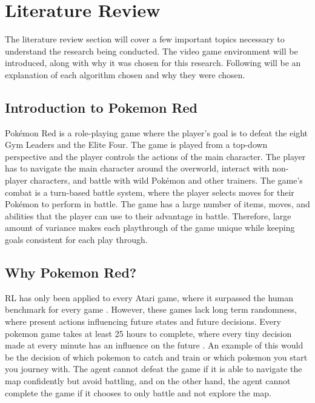 \section{Literature Review}

The literature review section will cover a few important topics necessary to understand the research being conducted. The video game environment will be introduced, along with why it was chosen for this research. Following will be an explanation of each algorithm chosen and why they were chosen.

\subsection{Introduction to Pokemon Red}

Pokémon Red is a role-playing game where the player's goal is to defeat the eight Gym Leaders and the Elite Four. The game is played from a top-down perspective and the player controls the actions of the main character. The player has to navigate the main character around the overworld, interact with non-player characters, and battle with wild Pokémon and other trainers. The game's combat is a turn-based battle system, where the player selects moves for their Pokémon to perform in battle. The game has a large number of items, moves, and abilities that the player can use to their advantage in battle. Therefore, large amount of variance makes each playthrough of the game unique while keeping goals consistent for each play through.

\subsection{Why Pokemon Red?}

RL has only been applied to every Atari game, where it surpassed the human benchmark for every game \cite{brockman2016openai}. However, these games lack long term randomness, where present actions influencing future states and future decisions. Every pokemon game takes at least 25 hours to complete, where every tiny decision made at every minute has an influence on the future \cite{howlongtobeat}. An example of this would be the decision of which pokemon to catch and train or which pokemon you start you journey with. The agent cannot defeat the game if it is able to navigate the map confidently but avoid battling, and on the other hand, the agent cannot complete the game if it chooses to only battle and not explore the map.
 
